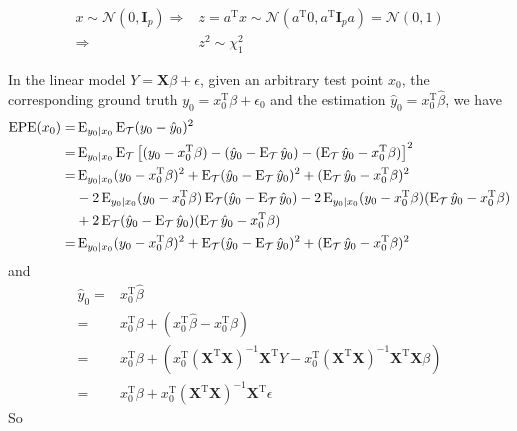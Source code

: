 \begin{sol}
\begin{align*}
x\sim\mathcal{N}(0,\mathbf{I}_p)\Longrightarrow & z=a^\mathrm{T}x\sim\mathcal{N}(a^\mathrm{T}0,a^\mathrm{T}\mathbf{I}_pa)=\mathcal{N}(0,1)\\
\Longrightarrow & z^2\sim \chi_1^2
\end{align*}
\end{sol}

\begin{sol}
In the linear model $Y=\mathbf{X}\beta+\epsilon$, given an arbitrary test point $x_0$, the corresponding ground truth $y_0=x_0^\mathrm{T}\beta+\epsilon_0$ and the estimation $\hat{y}_0=x_0^\mathrm{T}\hat{\beta}$, we have
\begin{align*}
\mathrm{EPE}(x_0) = & \operatorname{E}_{y_0\vert x_0}\operatorname{E}_{\mathcal{T}}(y_0-\hat{y}_0)^2\\
=& \operatorname{E}_{y_0\vert x_0}\operatorname{E}_{\mathcal{T}}\left[(y_0-x_0^\mathrm{T}\beta)-(\hat{y}_0-\operatorname{E}_\mathcal{T}\hat{y}_0)-(\operatorname{E}_\mathcal{T}\hat{y}_0-x_0^\mathrm{T}\beta)\right]^2 \\
=& \operatorname{E}_{y_0\vert x_0}(y_0-x_0^\mathrm{T}\beta)^2+\operatorname{E}_{\mathcal{T}}(\hat{y}_0-\operatorname{E}_\mathcal{T}\hat{y}_0)^2+(\operatorname{E}_\mathcal{T}\hat{y}_0-x_0^\mathrm{T}\beta)^2 \\
& -2 \operatorname{E}_{y_0\vert x_0}(y_0-x_0^\mathrm{T}\beta) \operatorname{E}_{\mathcal{T}}(\hat{y}_0-\operatorname{E}_\mathcal{T}\hat{y}_0) -2 \operatorname{E}_{y_0\vert x_0}(y_0-x_0^\mathrm{T}\beta) (\operatorname{E}_\mathcal{T}\hat{y}_0-x_0^\mathrm{T}\beta) \\
& +2 \operatorname{E}_{\mathcal{T}}(\hat{y}_0-\operatorname{E}_\mathcal{T}\hat{y}_0)(\operatorname{E}_\mathcal{T}\hat{y}_0-x_0^\mathrm{T}\beta) \\
=& \operatorname{E}_{y_0\vert x_0}(y_0-x_0^\mathrm{T}\beta)^2+\operatorname{E}_{\mathcal{T}}(\hat{y}_0-\operatorname{E}_\mathcal{T}\hat{y}_0)^2+(\operatorname{E}_\mathcal{T}\hat{y}_0-x_0^\mathrm{T}\beta)^2
\end{align*}
and
\begin{align*}
\hat{y}_0 =& x_0^\mathrm{T}\hat{\beta}\\
=& x_0^\mathrm{T}\beta + (x_0^\mathrm{T}\hat{\beta}-x_0^\mathrm{T}\beta)\\
=& x_0^\mathrm{T}\beta + (x_0^\mathrm{T}(\mathbf{X}^\mathrm{T}\mathbf{X})^{-1}\mathbf{X}^\mathrm{T}Y-x_0^\mathrm{T}(\mathbf{X}^\mathrm{T}\mathbf{X})^{-1}\mathbf{X}^\mathrm{T}\mathbf{X}\beta) \\
=& x_0^\mathrm{T}\beta + x_0^\mathrm{T}(\mathbf{X}^\mathrm{T}\mathbf{X})^{-1}\mathbf{X}^\mathrm{T}\epsilon
\end{align*}
So
\begin{align*}

\end{align*}
\end{sol}
